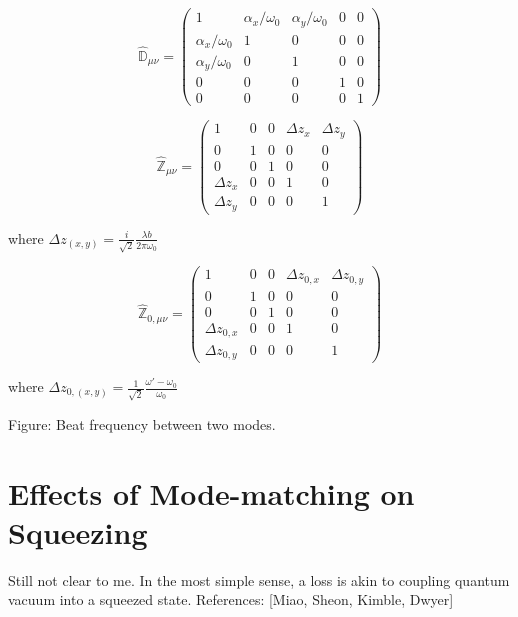 \documentclass[oneside]{book}
\begin{document}
		\begin{equation} \label{mistrans_matrix}
		\hat{\mathbb{D}}_{\mu \nu} = 
		\begin{pmatrix}
			1					&\alpha_x/\omega_{0}	&\alpha_y/\omega_{0}	& 0 & 0
		\\ \alpha_x/\omega_{0}	&1						&0						& 0 & 0
		\\ \alpha_y/\omega_{0}	&0						&1						& 0	& 0
		\\ 0					&0						&0						& 1	& 0
		\\ 0					&0						&0						& 0 & 1 
		\end{pmatrix}
		\end{equation}
		
		
		\begin{equation} \label{waistloc_matrix}
		\hat{\mathbb{Z}}_{\mu \nu} = 
		\begin{pmatrix}
		1				&0		&0		&\Delta z_x 	&\Delta z_y  
		\\ 0			&1		&0		&0 				&0
		\\ 0			&0		&1		&0 				&0
		\\ \Delta z_x	&0		&0		&1 				&0
		\\ \Delta z_y	&0		&0		&0				&1 
		\end{pmatrix}
		\end{equation}
		
		where $\Delta z_{(x,y)} =  \frac{i}{\sqrt{2}} \frac{\lambda b }{2\pi \omega_{0}} $
		
		
		\begin{equation} \label{waistsize_matrix}
		\hat{\mathbb{Z}}_{0, \mu \nu} = 
		\begin{pmatrix}
		1					&0		&0		&\Delta z_{0,x} 	&\Delta z_{0,y} 
		\\ 0				&1		&0		&0 					&0
		\\ 0				&0		&1		&0 					&0
		\\ \Delta z_{0,x} 	&0		&0		&1 					&0
		\\ \Delta z_{0,y} 	&0		&0		&0					&1 
		\end{pmatrix}
		\end{equation}

		where $\Delta z_{0,(x,y)} =   \frac{1}{\sqrt{2}} \frac{\omega'-\omega_{0}}{\omega_{0}} $

		Figure: Beat frequency between two modes.

		\section{Effects of Mode-matching on Squeezing}
		Still not clear to me.
		In the most simple sense, a loss is akin to coupling quantum vacuum into a squeezed state.
		References: [Miao, Sheon, Kimble, Dwyer]
	
\end{document}
